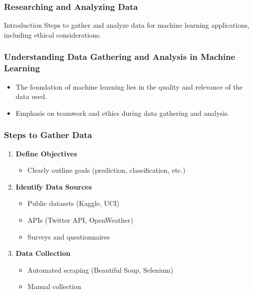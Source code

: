 \documentclass[aspectratio=169]{beamer}
\begin{document}
\begin{frame}[fragile]
    \frametitle{Researching and Analyzing Data}
    \begin{block}{Introduction}
        Steps to gather and analyze data for machine learning applications, including ethical considerations.
    \end{block}
\end{frame}

\begin{frame}[fragile]
    \frametitle{Understanding Data Gathering and Analysis in Machine Learning}
    \begin{itemize}
        \item The foundation of machine learning lies in the quality and relevance of the data used.
        \item Emphasis on teamwork and ethics during data gathering and analysis.
    \end{itemize}
\end{frame}

\begin{frame}[fragile]
    \frametitle{Steps to Gather Data}
    \begin{enumerate}
        \item \textbf{Define Objectives}
            \begin{itemize}
                \item Clearly outline goals (prediction, classification, etc.)
            \end{itemize}
        \item \textbf{Identify Data Sources}
            \begin{itemize}
                \item Public datasets (Kaggle, UCI)
                \item APIs (Twitter API, OpenWeather)
                \item Surveys and questionnaires
            \end{itemize}
        \item \textbf{Data Collection}
            \begin{itemize}
                \item Automated scraping (Beautiful Soup, Selenium)
                \item Manual collection
            \end{itemize}
    \end{enumerate}
\end{frame}
\end{document}
